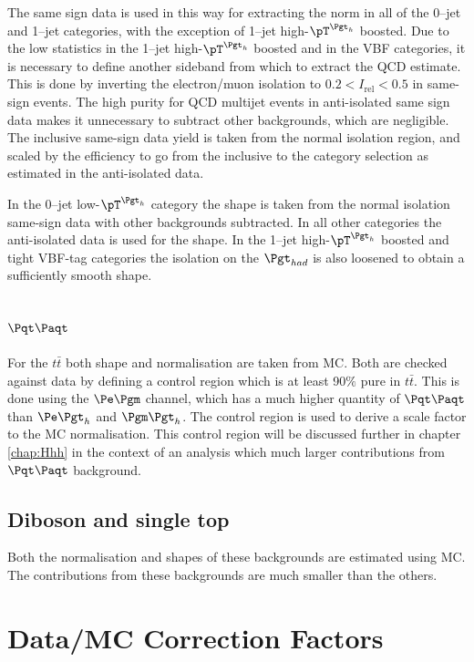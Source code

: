 The same sign data is used in this way for extracting the norm in all of the
0--jet and 1--jet
categories, with the exception of 1--jet high-$\pT^{\Pgth}$ boosted.
Due to the low statistics in the 1--jet high-$\pT^{\Pgth}$ boosted and in the VBF
categories, it is necessary to define another
sideband from which to extract the QCD estimate. This is done by inverting the
electron/muon isolation to $0.2 < I_{\text{rel}} < 0.5$ in same-sign events. 
The high purity for QCD multijet events in anti-isolated same sign data makes 
it unnecessary to subtract other backgrounds, which are negligible. 
The inclusive same-sign data yield is taken from the normal 
isolation region, and scaled by the efficiency to go from the inclusive to the 
category selection as estimated in the anti-isolated data. 

In the 0--jet low-$\pT^{\Pgth}$ category the shape is taken from the normal
isolation same-sign data with other backgrounds subtracted. In all other
categories the anti-isolated data is used for the shape. In the 1--jet
high-$\pT^{\Pgth}$ boosted and tight VBF-tag categories the isolation on the
$\Pgt_{had}$ is also loosened to obtain a sufficiently smooth shape.  

\subsection{$\ttbar$}
\label{sec:backgroundEstimation_TT}

For the $t \bar{t}$ both shape and normalisation are taken from MC. Both are checked
against data by defining a control region which is at least 90$\%$ pure in
$t \bar{t}$. This is done using the $\emu$ channel, which has a much higher
quantity of $\ttbar$ than $\etau$ and $\mutau$. The control region is used to
derive a scale factor to the \ac{MC} normalisation. This control region will be
discussed further in chapter \ref{chap:Hhh} in the context of an analysis which
much larger contributions from $\ttbar$ background.  

\subsection{Diboson and single top}
Both the normalisation and shapes of these backgrounds are estimated using MC.
The contributions from these backgrounds are much smaller than the others.

\section{Data/MC Correction Factors}
\label{sec:datamcfactors}

